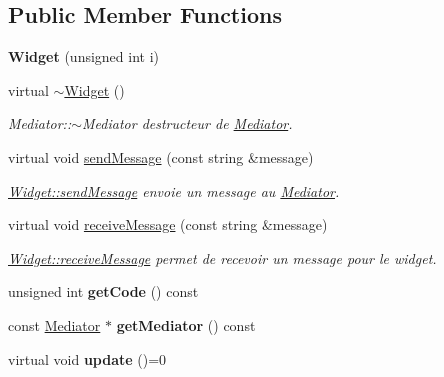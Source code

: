 \subsection*{Public Member Functions}
\begin{DoxyCompactItemize}
\item 
\mbox{\label{classWidget_afa1760fea43981e946d64c52d7f11956}} 
{\bfseries Widget} (unsigned int i)
\item 
\mbox{\label{classWidget_a714cf798aadb4d615f6f60a355382c02}} 
virtual \hyperlink{classWidget_a714cf798aadb4d615f6f60a355382c02}{$\sim$\+Widget} ()
\begin{DoxyCompactList}\small\item\em Mediator\+::$\sim$\+Mediator destructeur de \hyperlink{classMediator}{Mediator}. \end{DoxyCompactList}\item 
virtual void \hyperlink{classWidget_a3f249ee26ae63058896027c045477804}{send\+Message} (const string \&message)
\begin{DoxyCompactList}\small\item\em \hyperlink{classWidget_a3f249ee26ae63058896027c045477804}{Widget\+::send\+Message} envoie un message au \hyperlink{classMediator}{Mediator}. \end{DoxyCompactList}\item 
virtual void \hyperlink{classWidget_aa985218b1841d00fedc817d44b81b2ac}{receive\+Message} (const string \&message)
\begin{DoxyCompactList}\small\item\em \hyperlink{classWidget_aa985218b1841d00fedc817d44b81b2ac}{Widget\+::receive\+Message} permet de recevoir un message pour le widget. \end{DoxyCompactList}\item 
\mbox{\label{classWidget_a2da3cc9ed15edf1ad2340844a29aa2e1}} 
unsigned int {\bfseries get\+Code} () const
\item 
\mbox{\label{classWidget_a6451a6dc0ba268da5547a147fe909821}} 
const \hyperlink{classMediator}{Mediator} $\ast$ {\bfseries get\+Mediator} () const
\item 
\mbox{\label{classWidget_a726dc97add2c6eb82967144207280ace}} 
virtual void {\bfseries update} ()=0
\end{DoxyCompactItemize}
